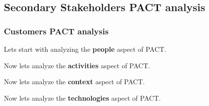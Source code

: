 \documentclass[]{VUMIFTemplateClass}
\begin{document}
\subsection{Secondary Stakeholders PACT analysis}

\subsubsection{Customers PACT analysis}

Lets start with analyzing the \textbf{people} aspect of PACT. 

Now lets analyze the \textbf{activities} aspect of PACT.

Now lets analyze the \textbf{context} aspect of PACT.

Now lets analyze the \textbf{technologies} aspect of PACT.

\printbibliography[title = {References and sources}]





\end{document}
